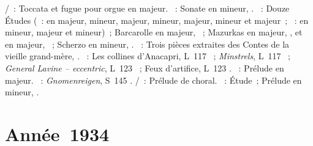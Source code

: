 \begin{description}
 \textsc{\JBach{}/\Busoni{}}~: Toccata et fugue pour orgue en \kC majeur.
 \textsc{\Beethoven{}}~: Sonate en \kC \Sharp mineur,  .
 \textsc{\Chopin{}}~: Douze Études (~: en \kC majeur, \kA mineur,
 \kE majeur, \kC \Sharp mineur, \kG \Flat majeur, \kE \Flat mineur et \kF
 majeur~; ~: en \kF mineur, \kF majeur et \kC mineur)~; Barcarolle
 en \kF \Sharp majeur, ~; Mazurkas en \kD majeur, 
 , et en \kB majeur,  ~; Scherzo en \kB \Flat
 mineur, .
 \textsc{\Prokofiev{}}~: Trois pièces extraites des Contes de la vieille
 grand-mère, .
 \textsc{\Debussy{}}~: Les collines d'\hbox{Anacapri}, L~117 ~;
 \emph{Minstrels}, L~117 ~; \emph{General Lavine -- eccentric},
 L~123 ~; Feux d'artifice, L~123 .
 \textsc{\Rachmaninov{}}~: Prélude en \kG majeur.
 \textsc{\Liszt{}}~: \emph{Gnomenreigen}, S~145 .
 \textsc{\JBach{}/\Busoni{}}~: Prélude de choral.
 \textsc{\Chopin{}}~: Étude~; Prélude en \kD mineur,  .
\end{description}

\section{Année~1934}

